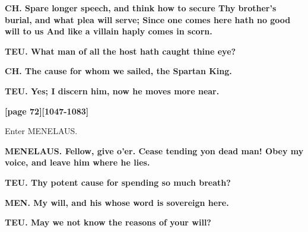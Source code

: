 \documentclass[11pt,letter]{book}
\begin{document}
\par \textbf{CH. Spare longer speech, and think how to secure Thy brother’s burial, and what plea will serve; Since one comes here hath no good will to us And like a villain haply comes in scorn.}
\par 

\par \textbf{TEU. What man of all the host hath caught thine eye?}
\par 

\par \textbf{CH. The cause for whom we sailed, the Spartan King.}
\par 

\par \textbf{TEU. Yes; I discern him, now he moves more near.}
\par 

\par \textbf{[page 72][1047-1083]}
\par 

\par  Enter MENELAUS.

\par \textbf{MENELAUS. Fellow, give o’er. Cease tending yon dead man! Obey my voice, and leave him where he lies.}
\par 

\par \textbf{TEU. Thy potent cause for spending so much breath?}
\par 

\par \textbf{MEN. My will, and his whose word is sovereign here.}
\par 

\par \textbf{TEU. May we not know the reasons of your will?}
\par 
\end{document}
